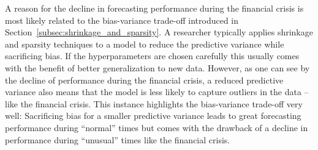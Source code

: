 A reason for the decline in forecasting performance during the financial crisis is most likely related to the bias-variance trade-off introduced in Section~\ref{subsec:shrinkage_and_sparsity}. A researcher typically applies shrinkage and sparsity techniques to a model to reduce the predictive variance while sacrificing bias. If the hyperparameters are chosen carefully this usually comes with the benefit of better generalization to new data. However, as one can see by the decline of performance during the financial crisis, a reduced predictive variance also means that the model is less likely to capture outliers in the data -- like the financial crisis. This instance highlights the bias-variance trade-off very well: Sacrificing bias for a smaller predictive variance leads to great forecasting performance during ``normal'' times but comes with the drawback of a decline in performance during ``unusual'' times like the financial crisis.
